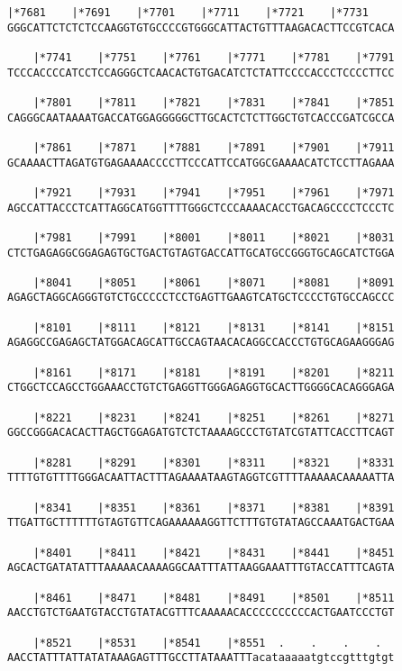 \documentclass{article}
\begin{document}
\begin{Verbatim}[fontfamily=courier]
    |*7681    |*7691    |*7701    |*7711    |*7721    |*7731
GGGCATTCTCTCTCCAAGGTGTGCCCCGTGGGCATTACTGTTTAAGACACTTCCGTCACA

    |*7741    |*7751    |*7761    |*7771    |*7781    |*7791
TCCCACCCCATCCTCCAGGGCTCAACACTGTGACATCTCTATTCCCCACCCTCCCCTTCC

    |*7801    |*7811    |*7821    |*7831    |*7841    |*7851
CAGGGCAATAAAATGACCATGGAGGGGGCTTGCACTCTCTTGGCTGTCACCCGATCGCCA

    |*7861    |*7871    |*7881    |*7891    |*7901    |*7911
GCAAAACTTAGATGTGAGAAAACCCCTTCCCATTCCATGGCGAAAACATCTCCTTAGAAA

    |*7921    |*7931    |*7941    |*7951    |*7961    |*7971
AGCCATTACCCTCATTAGGCATGGTTTTGGGCTCCCAAAACACCTGACAGCCCCTCCCTC

    |*7981    |*7991    |*8001    |*8011    |*8021    |*8031
CTCTGAGAGGCGGAGAGTGCTGACTGTAGTGACCATTGCATGCCGGGTGCAGCATCTGGA

    |*8041    |*8051    |*8061    |*8071    |*8081    |*8091
AGAGCTAGGCAGGGTGTCTGCCCCCTCCTGAGTTGAAGTCATGCTCCCCTGTGCCAGCCC

    |*8101    |*8111    |*8121    |*8131    |*8141    |*8151
AGAGGCCGAGAGCTATGGACAGCATTGCCAGTAACACAGGCCACCCTGTGCAGAAGGGAG

    |*8161    |*8171    |*8181    |*8191    |*8201    |*8211
CTGGCTCCAGCCTGGAAACCTGTCTGAGGTTGGGAGAGGTGCACTTGGGGCACAGGGAGA

    |*8221    |*8231    |*8241    |*8251    |*8261    |*8271
GGCCGGGACACACTTAGCTGGAGATGTCTCTAAAAGCCCTGTATCGTATTCACCTTCAGT

    |*8281    |*8291    |*8301    |*8311    |*8321    |*8331
TTTTGTGTTTTGGGACAATTACTTTAGAAAATAAGTAGGTCGTTTTAAAAACAAAAATTA

    |*8341    |*8351    |*8361    |*8371    |*8381    |*8391
TTGATTGCTTTTTTGTAGTGTTCAGAAAAAAGGTTCTTTGTGTATAGCCAAATGACTGAA

    |*8401    |*8411    |*8421    |*8431    |*8441    |*8451
AGCACTGATATATTTAAAAACAAAAGGCAATTTATTAAGGAAATTTGTACCATTTCAGTA

    |*8461    |*8471    |*8481    |*8491    |*8501    |*8511
AACCTGTCTGAATGTACCTGTATACGTTTCAAAAACACCCCCCCCCCACTGAATCCCTGT

    |*8521    |*8531    |*8541    |*8551  .    .    .    .  
AACCTATTTATTATATAAAGAGTTTGCCTTATAAATTTacataaaaatgtccgtttgtgt

\end{Verbatim}
\newpage
\end{document}
